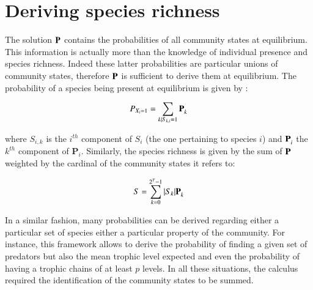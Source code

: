 \section{Deriving species richness}\label{deriving-species-richness}

The solution \(\mathbf{P}^{\*}\) contains the probabilities of all
community states at equilibrium. This information is actually more than
the knowledge of individual presence and species richness. Indeed these
latter probabilities are particular unions of community states,
therefore \(\mathbf{P}^{\*}\) is sufficient to derive them at
equilibrium. The probability of a species being present at equilibrium
is given by :

\begin{equation}
P_{X_i=1} = \sum_{k \mid S_{k,i}=1} \mathbf{P}_{k}^{\*}
\end{equation}

where \(S_{i,k}\) is the \(i^{th}\) component of \(S_i\) (the one
pertaining to species \(i\)) and \(\mathbf{P}_{i}^{\*}\) the \(k^{th}\)
component of \(\mathbf{P}_{i}\). Similarly, the species richness is
given by the sum of \(\mathbf{P}^{\*}\) weighted by the cardinal of the
community states it refers to:

\begin{equation}
S= \sum_{k=0}^{2^T-1} |S_k|\mathbf{P}_{k}^{\*}
\end{equation}

In a similar fashion, many probabilities can be derived regarding either
a particular set of species either a particular property of the
community. For instance, this framework allows to derive the probability
of finding a given set of predators but also the mean trophic level
expected and even the probability of having a trophic chains of at least
\(p\) levels. In all these situations, the calculus required the
identification of the community states to be summed.

\newpage

